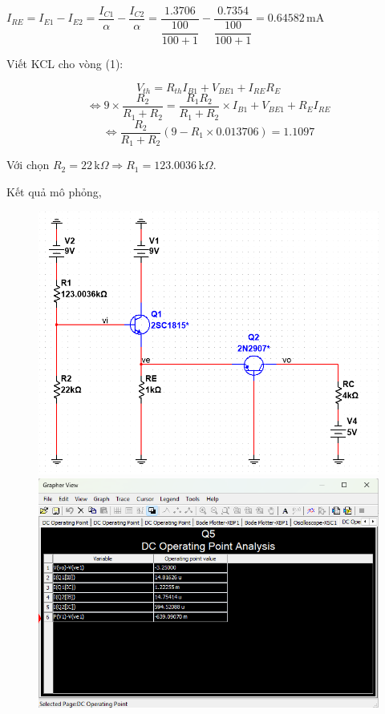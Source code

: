 $I_{RE} = I_{E1} - I_{E2} = \dfrac{I_{C1}}{\alpha} - \dfrac{I_{C2}}{\alpha} = \dfrac{1.3706}{\dfrac{100}{100+1}} - \dfrac{0.7354}{\dfrac{100}{100+1}} = 0.64582\,\text{mA}$

Viết KCL cho vòng (1):

\[ V_{th} = R_{th}I_{B1} + V_{BE1} + I_{RE}R_{E} \]
\[ \Leftrightarrow 9\times \dfrac{R_{2}}{R_{1} + R_{2}} = \dfrac{R_{1}R_{2}}{R_{1} + R_{2}}\times I_{B1} + V_{BE1} + R_{E}I_{RE} \]
\[ \Leftrightarrow \dfrac{R_{2}}{R_{1} + R_{2}}\left( 9 - R_{1}\times 0.013706 \right) = 1.1097 \]

Với chọn $R_{2} = 22\,\text{k}\Omega \Rightarrow R_{1} = 123.0036\,\text{k}\Omega$.

Kết quả mô phỏng,

\begin{figure}[H]
	\centering
	\begin{minipage}{.4\linewidth}
		\includegraphics[width=\linewidth]{./my-chapters/my-images/Question5/b_ketqua_R1R2.png}
	\end{minipage}
	\begin{minipage}{.4\linewidth}
		\includegraphics[width=\linewidth]{./my-chapters/my-images/Question5/b_ketqua.png}
	\end{minipage}
\end{figure}

